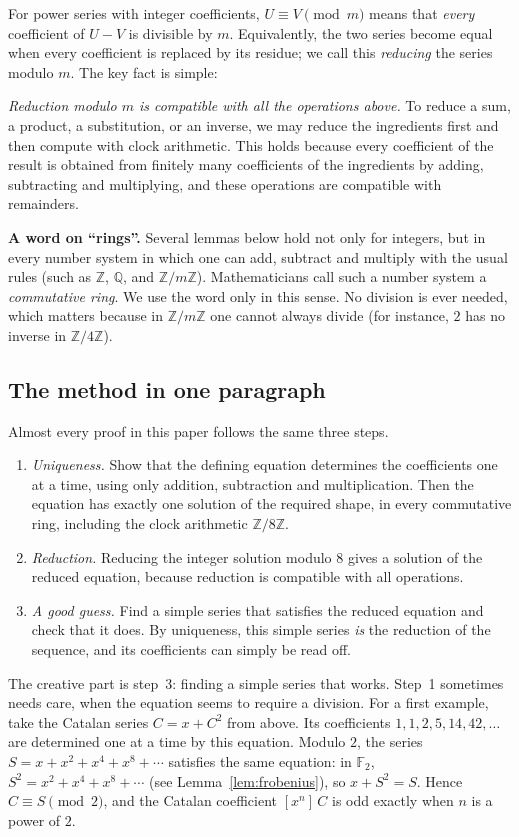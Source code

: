 \documentclass[11pt,a4paper]{article}
\theoremstyle{definition}
\theoremstyle{remark}
\newcommand{\Z}{\mathbb{Z}}
\newcommand{\Q}{\mathbb{Q}}
\newcommand{\F}{\mathbb{F}}
\newcommand{\coeff}[2]{[x^{#1}]\,#2}
\newcommand{\para}[1]{\par\medskip\noindent\textbf{#1}\enspace}
\begin{document}
For power series with integer coefficients, $U\equiv V\pmod m$ means that \emph{every} coefficient of $U-V$ is
divisible by $m$. Equivalently, the two series become equal when every coefficient is replaced by its residue; we call
this \emph{reducing} the series modulo $m$. The key fact is simple:

\emph{Reduction modulo $m$ is compatible with all the operations above.} To reduce a sum, a product, a substitution, or
an inverse, we may reduce the ingredients first and then compute with clock arithmetic. This holds because every
coefficient of the result is obtained from finitely many coefficients of the ingredients by adding, subtracting and
multiplying, and these operations are compatible with remainders.

\para{A word on ``rings''.} Several lemmas below hold not only for integers, but in every number system in
which one can add, subtract and multiply with the usual rules (such as $\Z$, $\Q$, and $\Z/m\Z$). Mathematicians call
such a number system a \emph{commutative ring}. We use the word only in this sense. No division is ever needed, which
matters because in $\Z/m\Z$ one cannot always divide (for instance, $2$ has no inverse in $\Z/4\Z$).

\subsection{The method in one paragraph}
Almost every proof in this paper follows the same three steps.
\begin{enumerate}
\item \emph{Uniqueness.} Show that the defining equation determines the coefficients one at a time, using only
addition, subtraction and multiplication. Then the equation has exactly one solution of the required shape, in every
commutative ring, including the clock arithmetic $\Z/8\Z$.
\item \emph{Reduction.} Reducing the integer solution modulo $8$ gives a solution of the reduced equation,
because reduction is compatible with all operations.
\item \emph{A good guess.} Find a simple series that satisfies the reduced equation and check that it does. By uniqueness,
this simple series \emph{is} the reduction of the sequence, and its coefficients can simply be read off.
\end{enumerate}
The creative part is step~3: finding a simple series that works. Step~1 sometimes needs care, when the equation seems to
require a division.
For a first example, take the Catalan series $C=x+C^2$ from above. Its coefficients $1,1,2,5,14,42,\dots$ are
determined one at a time by this equation. Modulo $2$, the series $S=x+x^2+x^4+x^8+\cdots$ satisfies the same
equation: in $\F_2$, $S^2=x^2+x^4+x^8+\cdots$ (see Lemma~\ref{lem:frobenius}), so $x+S^2=S$. Hence $C\equiv S\pmod2$,
and the Catalan coefficient $\coeff{n}{C}$ is odd exactly when $n$ is a power of $2$.
\end{document}
